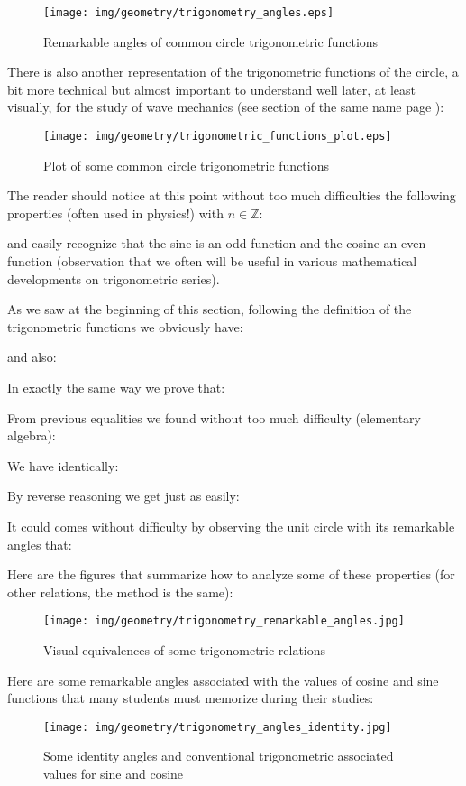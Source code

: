 \begin{figure}[H]
\centering
\texttt{[image: img/geometry/trigonometry\_angles.eps]}
\caption{Remarkable angles of common circle trigonometric functions}
\end{figure}

There is also another representation of the trigonometric functions of the circle, a bit more technical but almost important to understand well later, at least visually, for the study of wave mechanics (see section of the same name page \pageref{wave mechanics}):

\begin{figure}[H]
\centering
\texttt{[image: img/geometry/trigonometric\_functions\_plot.eps]}
\caption{Plot of some common circle trigonometric functions}
\end{figure}

The reader should notice at this point without too much difficulties the following properties (often used in physics!) with $n \in \mathbb{Z}$\label{periodicity trigonometric functions}:
	
and easily recognize that the sine is an odd function and the cosine an even function (observation that we often will be useful in various mathematical developments on trigonometric series).

As we saw at the beginning of this section, following the definition of the trigonometric functions we obviously have:
	
	and also:
	
	In exactly the same way we prove that:
	
	From previous equalities we found without too much difficulty (elementary algebra):
	
	We have identically:
	
	By reverse reasoning we get just as easily:
	
	It could comes without difficulty by observing the unit circle with its remarkable angles that\label{remarkable angles}:
	
	Here are the figures that summarize how to analyze some of these properties (for other relations, the method is the same):
	\begin{figure}[H]
		\centering
		\texttt{[image: img/geometry/trigonometry\_remarkable\_angles.jpg]}
		\caption{Visual equivalences of some trigonometric relations}
	\end{figure}
	Here are some remarkable angles associated with the values of cosine and sine functions that many students must memorize during their studies:
	\begin{figure}[H]
		\centering
		\texttt{[image: img/geometry/trigonometry\_angles\_identity.jpg]}
		\caption{Some identity angles and conventional trigonometric associated values for sine and cosine}
	\end{figure}


